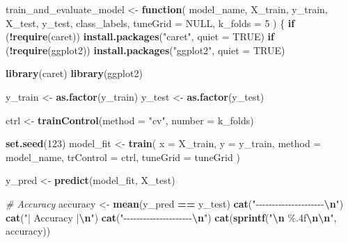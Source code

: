 \documentclass[
]{article}
\newenvironment{Shaded}{\begin{snugshade}}{\end{snugshade}}
\newcommand{\AttributeTok}[1]{\textcolor[rgb]{0.13,0.29,0.53}{#1}}
\newcommand{\CommentTok}[1]{\textcolor[rgb]{0.56,0.35,0.01}{\textit{#1}}}
\newcommand{\ConstantTok}[1]{\textcolor[rgb]{0.56,0.35,0.01}{#1}}
\newcommand{\ControlFlowTok}[1]{\textcolor[rgb]{0.13,0.29,0.53}{\textbf{#1}}}
\newcommand{\DecValTok}[1]{\textcolor[rgb]{0.00,0.00,0.81}{#1}}
\newcommand{\FunctionTok}[1]{\textcolor[rgb]{0.13,0.29,0.53}{\textbf{#1}}}
\newcommand{\NormalTok}[1]{#1}
\newcommand{\OtherTok}[1]{\textcolor[rgb]{0.56,0.35,0.01}{#1}}
\newcommand{\SpecialCharTok}[1]{\textcolor[rgb]{0.81,0.36,0.00}{\textbf{#1}}}
\newcommand{\StringTok}[1]{\textcolor[rgb]{0.31,0.60,0.02}{#1}}
\begin{document}
\begin{Shaded}
\begin{Highlighting}[]
\NormalTok{train\_and\_evaluate\_model }\OtherTok{\textless{}{-}} \ControlFlowTok{function}\NormalTok{(}
\NormalTok{  model\_name,}
\NormalTok{  X\_train, y\_train, X\_test, y\_test,}
\NormalTok{  class\_labels,}
  \AttributeTok{tuneGrid =} \ConstantTok{NULL}\NormalTok{,}
  \AttributeTok{k\_folds =} \DecValTok{5}
\NormalTok{) \{}
  \ControlFlowTok{if}\NormalTok{ (}\SpecialCharTok{!}\FunctionTok{require}\NormalTok{(caret)) }\FunctionTok{install.packages}\NormalTok{(}\StringTok{"caret"}\NormalTok{, }\AttributeTok{quiet =} \ConstantTok{TRUE}\NormalTok{)}
  \ControlFlowTok{if}\NormalTok{ (}\SpecialCharTok{!}\FunctionTok{require}\NormalTok{(ggplot2)) }\FunctionTok{install.packages}\NormalTok{(}\StringTok{"ggplot2"}\NormalTok{, }\AttributeTok{quiet =} \ConstantTok{TRUE}\NormalTok{)}

  \FunctionTok{library}\NormalTok{(caret)}
  \FunctionTok{library}\NormalTok{(ggplot2)}

\NormalTok{  y\_train }\OtherTok{\textless{}{-}} \FunctionTok{as.factor}\NormalTok{(y\_train)}
\NormalTok{  y\_test }\OtherTok{\textless{}{-}} \FunctionTok{as.factor}\NormalTok{(y\_test)}

\NormalTok{  ctrl }\OtherTok{\textless{}{-}} \FunctionTok{trainControl}\NormalTok{(}\AttributeTok{method =} \StringTok{"cv"}\NormalTok{, }\AttributeTok{number =}\NormalTok{ k\_folds)}

  \FunctionTok{set.seed}\NormalTok{(}\DecValTok{123}\NormalTok{)}
\NormalTok{  model\_fit }\OtherTok{\textless{}{-}} \FunctionTok{train}\NormalTok{(}
    \AttributeTok{x =}\NormalTok{ X\_train,}
    \AttributeTok{y =}\NormalTok{ y\_train,}
    \AttributeTok{method =}\NormalTok{ model\_name,}
    \AttributeTok{trControl =}\NormalTok{ ctrl,}
    \AttributeTok{tuneGrid =}\NormalTok{ tuneGrid}
\NormalTok{  )}

\NormalTok{  y\_pred }\OtherTok{\textless{}{-}} \FunctionTok{predict}\NormalTok{(model\_fit, X\_test)}

  \CommentTok{\# Accuracy}
\NormalTok{  accuracy }\OtherTok{\textless{}{-}} \FunctionTok{mean}\NormalTok{(y\_pred }\SpecialCharTok{==}\NormalTok{ y\_test)}
  \FunctionTok{cat}\NormalTok{(}\StringTok{"{-}{-}{-}{-}{-}{-}{-}{-}{-}{-}{-}{-}{-}{-}{-}{-}{-}{-}{-}{-}{-}}\SpecialCharTok{\textbackslash{}n}\StringTok{"}\NormalTok{)}
  \FunctionTok{cat}\NormalTok{(}\StringTok{"|      Accuracy      |}\SpecialCharTok{\textbackslash{}n}\StringTok{"}\NormalTok{)}
  \FunctionTok{cat}\NormalTok{(}\StringTok{"{-}{-}{-}{-}{-}{-}{-}{-}{-}{-}{-}{-}{-}{-}{-}{-}{-}{-}{-}{-}{-}}\SpecialCharTok{\textbackslash{}n}\StringTok{"}\NormalTok{)}
  \FunctionTok{cat}\NormalTok{(}\FunctionTok{sprintf}\NormalTok{(}\StringTok{"}\SpecialCharTok{\textbackslash{}n}\StringTok{    \%.4f}\SpecialCharTok{\textbackslash{}n\textbackslash{}n}\StringTok{"}\NormalTok{, accuracy))}


\end{Highlighting}
\end{Shaded}
\end{document}
